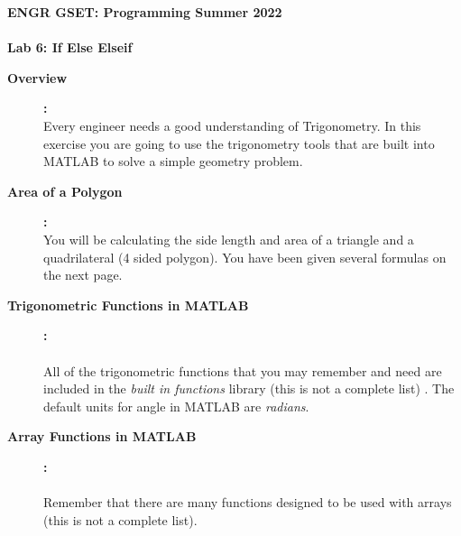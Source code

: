 \documentclass[11pt]{article}
\newcommand{\secNum}{GSET: Programming}
\newcommand{\assnType}{Lab}
\newcommand{\assnTitle}{If Else Elseif}
\newcommand{\assnNum}{6}
\newcommand{\currTerm}{Summer 2022}
\begin{document}
	\textbf{\LARGE ENGR \hspace{2mm}\secNum \hspace{3mm} \currTerm} \\\\
	\textbf{\LARGE \assnType \hspace{1mm}  \assnNum : \assnTitle}
    
    \Large
	\begin{description}
		
		\item [\textbf{Overview}]\textbf{:} \\ 
        
            Every engineer needs a good understanding of Trigonometry. In this exercise you are going to use the trigonometry tools that are built into MATLAB to solve a simple geometry problem.
        
        \item [\textbf{Area of a Polygon}]\textbf{:} \\
        
            You will be calculating the side length and area of a triangle and a quadrilateral (4 sided polygon). You have been given several formulas on the next page. \\
        
        
\item [\textbf{Trigonometric Functions in MATLAB }]\textbf{:}\\\\ All of the trigonometric functions that you may remember and need are included in the {\it built in functions} library (this is not a complete list) . The default units for angle in MATLAB are {\it radians}.   

    \begin{itemize}             
    \end{itemize}
 \vspace{20mm}
\item [\textbf{Array Functions in MATLAB }]\textbf{:}\\\\ Remember that there are many functions designed to be used with arrays (this is not a complete list).  


\end{description}
\end{document}

